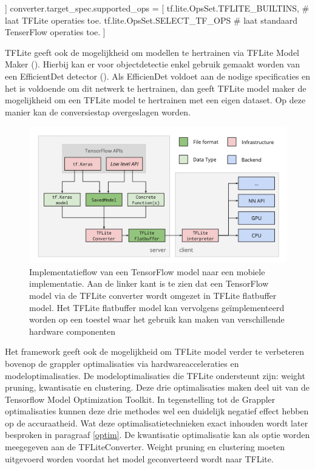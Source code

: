 \begin{python}]
converter.target_spec.supported_ops = [
	tf.lite.OpsSet.TFLITE_BUILTINS, # laat TFLite operaties toe.
	tf.lite.OpsSet.SELECT_TF_OPS # laat standaard TenserFlow operaties toe.
  ]
\end{python}	

TFLite geeft ook de mogelijkheid om modellen te hertrainen via TFLite Model Maker (\cite{tensorflow2015-whitepaper}).
Hierbij kan er voor objectdetectie enkel gebruik gemaakt worden van een EfficientDet detector (\cite{tan_efficientdet_2020}).
Als EfficienDet voldoet aan de nodige specificaties en het is voldoende om dit netwerk te hertrainen, dan geeft TFLite model maker de mogelijkheid om een TFLite model te hertrainen met een eigen dataset.
Op deze manier kan de conversiestap overgeslagen worden.

\begin{figure}[!ht]
    \centering
 	\includegraphics[width=0.85\linewidth]{fig/TFLite_workflow.png}
 	\caption{Implementatieflow van een TensorFlow model naar een mobiele implementatie. Aan de linker kant is te zien dat een TensorFlow model via de TFLite converter wordt omgezet in TFLite flatbuffer model.
	 Het TFLite flatbuffer model kan vervolgens ge\"implementeerd worden op een toestel waar het gebruik kan maken van verschillende hardware componenten}
 	\label{fig:tflite}
\end{figure}

Het framework geeft ook de mogelijkheid om TFLite model verder te verbeteren bovenop de grappler optimalisaties via hardwareacceleraties en modeloptimalisaties.
De modeloptimalisaties die TFLite ondersteunt zijn: weight pruning, kwantisatie en clustering.
Deze drie optimalisaties maken deel uit van de Tensorflow Model Optimization Toolkit.
In tegenstelling tot de Grappler optimalisaties kunnen deze drie methodes wel een duidelijk negatief effect hebben op de accuraatheid.
Wat deze optimalisatietechnieken exact inhouden wordt later besproken in paragraaf \ref{optim}.
De kwantisatie optimalisatie kan als optie worden meegegeven aan de TFLiteConverter.
Weight pruning en clustering moeten uitgevoerd worden voordat het model geconverteerd wordt naar TFLite.

